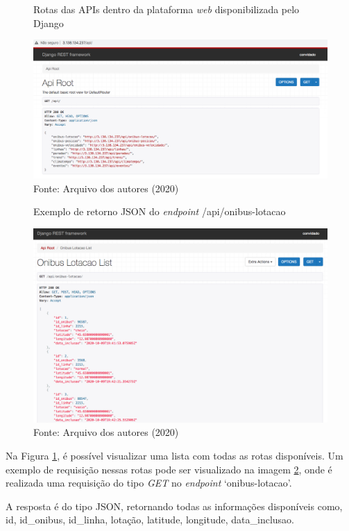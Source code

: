\begin{figure}[H]
    \centering
    \caption{Rotas das APIs dentro da plataforma \textit{web} disponibilizada pelo Django}
    \includegraphics[width=1.0\linewidth]{Imagens/rotasDisponiveis.png}
    \caption*{Fonte: Arquivo dos autores (2020)}
    \label{rotasDisponiveis}
\end{figure}
\begin{figure}[H]
    \centering
    \caption{Exemplo de retorno JSON do \textit{endpoint} /api/onibus-lotacao}
    \includegraphics[width=1.0\linewidth]{Imagens/onibusLotacaoExemplo.png}
    \caption*{Fonte: Arquivo dos autores (2020)}
    \label{onibusLotacaoExemplo}
\end{figure}
\indent
\par Na Figura \ref{rotasDisponiveis}, é possível visualizar uma lista com todas as rotas disponíveis. Um exemplo de requisição nessas rotas pode ser visualizado na imagem \ref{onibusLotacaoExemplo}, onde é realizada uma requisição do tipo \textit{GET} no \textit{endpoint} ‘onibus-lotacao’. 
\indent
\par A resposta é do tipo JSON, retornando todas as informações disponíveis como, id, id\_onibus, id\_linha, lotação, latitude, longitude, data\_inclusao.

